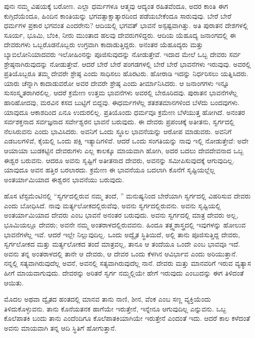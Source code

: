 ಪುನಃ ನಮ್ಮ ವಿಷಯಕ್ಕೆ ಬರೋಣ. ಎಲ್ಲಾ ಧರ್ಮಗಳೂ ಆತ್ಮವು ಆದ್ಯಂತ ರಹಿತವೆಂದೂ, ಅದರ ಕಾಂತಿ ಈಗ ಕುಗ್ಗಿದೆಯೆಂದೂ, ಹಿಂದಿನ ಕಾಂತಿಯನ್ನು ಭಗವತ್ಸಾಕ್ಷಾತ್ಕಾರದಿಂದ ಪಡೆಯಬೇಕೆಂದೂ ಸಾರುವುವು. ಬೇರೆ ಬೇರೆ ಧರ್ಮಗಳ ಪ್ರಕಾರ ಭಗವಂತ ಎಂದರೇನು? ಆದಿಯಲ್ಲಿ ಭಗವತ್ ಭಾವನೆ ಅಸ್ಪಷ್ಟವಾಗಿತ್ತು. ಅತಿ ಪುರಾತನ ದೇಶಗಳಲ್ಲಿ ಸೂರ್ಯ, ಭೂಮಿ, ಬೆಂಕಿ, ನೀರು ಮುಂತಾದ ಹಲವು ದೇವರುಗಳಿದ್ದರು. ಆದಿಯ ಯೆಹೂದ್ಯ ಜನಾಂಗದಲ್ಲಿ ಈ ದೇವರುಗಳು ಒಬ್ಬರೊಡನೊಬ್ಬರು ಉಗ್ರವಾಗಿ ಕಾದಾಡುತ್ತಿದ್ದರು. ಅನಂತರ ಯೆಹೂದ್ಯರು ಮತ್ತು ಬ್ಯಾಬಿಲೋನಿಯಾದವರು ಇಲೋಹಿಂನನ್ನು ಪೂಜಿಸುವುದನ್ನು ನೋಡುತ್ತೇವೆ. ಇದಾದ ಮೇಲೆ ಒಬ್ಬ ದೇವರು ಸರ್ವ ಶ್ರೇಷ್ಠನಾಗಿರುವುದನ್ನು ನೋಡುತ್ತೇವೆ. ಆದರೆ ಬೇರೆ ಬೇರೆ ಪಂಗಡಗಳಲ್ಲಿ ಬೇರೆ ಬೇರೆ ಭಾವನೆಗಳು ಇರುವುವು. ಅವರಲ್ಲಿ ಪ್ರತಿಯೊಬ್ಬರೂ ತಮ್ಮ ದೇವರೇ ಶ್ರೇಷ್ಠ ಎಂದು ಸಾಧಿಸಲು ಹೊರಟರು. ಹೋರಾಡಿ ಇದನ್ನು ನಿರ್ಧರಿಸಲು ಯತ್ನಿಸಿದರು. ಯಾರು ಚೆನ್ನಾಗಿ ಕಾದಾಡುವರೋ ಅವರ ದೇವರೇ ಶ್ರೇಷ್ಠ ಎಂದು ತೀರ್ಮಾನಿಸಿದರು. ಆ ಜನಾಂಗಗಳು ಇನ್ನೂ ಸುಸಂಸ್ಕೃತರಾಗಿರಲಿಲ್ಲ. ಆದರೆ ಕ್ರಮೇಣ ಉತ್ತಮ ಭಾವನೆಗಳು ಅವರಲ್ಲಿ ಬೇರೂರಿದವು. ಪುರಾತನ ಭಾವನೆಗಳೆಲ್ಲ ಹಾರಿಹೋದವು, ಮರವಿನ ಕಸದ ಬುಟ್ಟಿಗೆ ಬಿದ್ದವು. ಈ\break ಧರ್ಮಗಳೆಲ್ಲ ಶತಶತಮಾನಗಳಿಂದ ಬೆಳೆದು ಬಂದವುಗಳು. ಯಾವುದೂ ಆಕಾಶದಿಂದ ಏನೂ ಉದುರಲಿಲ್ಲ. ಪ್ರತಿಯೊಂದು ಧರ್ಮವೂ ಕ್ರಮೇಣ ಬೆಳೆಯುತ್ತ ಹೋಗಿದೆ. ಅನಂತರ ಸರ್ವಶಕ್ತನಾದ ಸರ್ವಜ್ಞನಾದ ಸರ್ವೇಶ್ವರನ ಭಾವನೆ ಬರುವುದು. ಈ ದೇವರು ಪ್ರಪಂಚಕ್ಕೆ ಅತೀತನು, ಸ್ವರ್ಗದಲ್ಲಿ ನೆಲಸಿರುವನು ಎಂದು ಭಾವಿಸಿದರು. ಅವನಿಗೆ ಒಂದು ಸ್ಥೂಲ ಭಾವನೆಯನ್ನು ಆರೋಪ ಮಾಡುವರು. ಅವನಿಗೆ ಎಡಬಲಗಳಿವೆ, ಕೈಯಲ್ಲಿ ಒಂದು ಪಕ್ಷಿ ಇತ್ಯಾದಿಗಳಿವೆ. ಆದರೆ ಒಂದು ಸಂಗತಿಯನ್ನು ನಾವು ಇಲ್ಲಿ ನೋಡುತ್ತೇವೆ: ಅದೇ ಆಯಾಯಾ ಬುಡಕಟ್ಟಿನ ದೇವರುಗಳು ಎಲ್ಲ ಕಾಲಕ್ಕೂ ಮಾಯವಾಗಿ ಹೋಗಿ, ಅದರ ಬದಲು ದೇವದೇವನಾದ ಒಬ್ಬ ಈಶ್ವರ ಬರುವನು. ಆದರೂ ಅವನು ಸೃಷ್ಟಿಗೆ ಅತೀತನಾದ ದೇವರು, ಅವನನ್ನು ಸಮೀಪಿಸುವುದಕ್ಕೆ ಆಗುವುದಿಲ್ಲ. ಯಾವುದೂ ಅವನ ಹತ್ತಿರ ಬರಲಾರದು. ಕ್ರಮೇಣ ಈ ಭಾವನೆಯೂ ಬದಲಾಗಿ ಕೊನೆಗೆ ಸೃಷ್ಟಿಯಲ್ಲೆಲ್ಲ ಅಂತರ್ಯಾಮಿಯಾದ ಈಶ್ವರನ ಭಾವನೆಯು ಬರುವುದು.

ಹೊಸ ಟೆಸ್ಟಮೆಂಟಿನಲ್ಲಿ “ಸ್ವರ್ಗದಲ್ಲಿರುವ ನಮ್ಮ ತಂದೆ, '' ಮನುಷ್ಯನಿಂದ ಬೇರೆಯಾಗಿ ಸ್ವರ್ಗದಲ್ಲಿ ವಿಹರಿಸುವ ದೇವರು ಎಂದು ಬೋಧಿಸಿದೆ. ನಾವು ಮರ್ತ್ಯಲೋಕದಲ್ಲಿರುವೆವು, ಅವನು ಸ್ವರ್ಗದಲ್ಲಿರುವನು. ಅವನು ಸೃಷ್ಟಿಯಲ್ಲಿ ಅಂತರ್ಯಾಮಿಯಾದ ದೇವರು ಎಂಬ ಭಾವನೆ ಅನಂತರ ಬರುವುದು. ಅವನು ಸ್ವರ್ಗದಲ್ಲಿ ಮಾತ್ರ ದೇವರು ಅಲ್ಲ, ಭೂಮಿಯಲ್ಲೂ ದೇವರು; ಅವನೇ ನಮ್ಮ ಅಂತರಾಳದಲ್ಲಿರುವವನು. ಹಿಂದೂ ತತ್ತ್ವಶಾಸ್ತ್ರದಲ್ಲಿ ಇವುಗಳನ್ನು ಹೋಲುವ ಭಾವನೆಗಳೆಲ್ಲ ಇವೆ. ಆದರೆ ಇಲ್ಲೇ ನಿಲ್ಲುವುದಿಲ್ಲ. ಒಂದು ಅದ್ವೈತ ಸ್ಥಿತಿಯಿದೆ, ಅಲ್ಲಿ ತಾನು ಪೂಜಿಸುತ್ತಿದ್ದ ದೇವರು, ಸ್ವರ್ಗಲೋಕದ ಮತ್ತು ಮರ್ತ್ಯಲೋಕದ ತಂದೆ ಮಾತ್ರವಲ್ಲ, ತಾನೂ ಆ ತಂದೆಯೂ ಒಂದೇ ಎಂಬ ಭಾವವೂ ಇದೆ. ಅವನು ತನ್ನ ಅಂತರಾಳದಲ್ಲಿ ತಾನೇ ಆ ದೇವರು, ಆ ದೇವರ ಒಂದು ಕೆಳಗಿನ ಆವಿರ್ಭಾವ ಎಂದು ಅರಿಯುತ್ತಾನೆ. ನನ್ನಲ್ಲಿ ಸತ್ಯವಾಗಿರುವುದೆಲ್ಲ ಅವನೆ, ಅವನಲ್ಲಿ ಸತ್ಯವಾಗಿರುವುದೆಲ್ಲ ನಾನೆ. ದೇವರು ಮತ್ತು ಮಾನವರಿಗೆ ಇರುವ ವ್ಯತ್ಯಾಸ ಹೀಗೆ ಮಾಯವಾಗುವುದು. ದೇವರನ್ನು ಅರಿತರೆ ಸ್ವರ್ಗ ನಮ್ಮಲ್ಲಿಯೇ ಹೇಗೆ ಇರುವುದು ಎಂಬುದನ್ನು ಈಗ ತಿಳಿದಂತೆ ಆಯಿತು.

ಮೊದಲ ಅಥವಾ ದ್ವೈತದ ಹಂತದಲ್ಲಿ ಮಾನವ ತಾನು ನಾಣಿ, ಶೀನ, ವೆಂಕ ಎಂಬ ಸಣ್ಣ ವ್ಯಕ್ತಿಯೆಂದು ತಿಳಿದುಕೊಳ್ಳುವನು. ತಾನು ಕೊನೆಯತನಕ ಹಾಗೆಯೇ ಇರುತ್ತೇನೆ, ಇನ್ನೇನೂ ಆಗುವುದಿಲ್ಲ ಎನ್ನುವನು. ಒಬ್ಬ ಕೊಲೆಪಾತಕಿ ಬಂದು ತಾನು ಎಂದೆಂದಿಗೂ ಕೊಲೆಪಾತಕಿಯಾಗಿಯೇ ಇರುತ್ತೇನೆ ಎಂದಂತೆ ಇದು. ಆದರೆ ಕಾಲ ಕಳೆದಂತೆ ಅವನು ಮಾಯವಾಗಿ ತನ್ನ ಆದಿ ಸ್ಥಿತಿಗೆ ಹೋಗುತ್ತಾನೆ.

